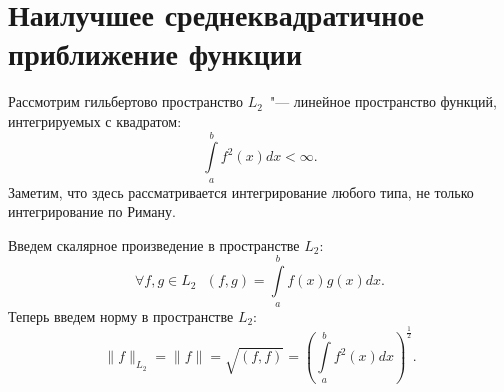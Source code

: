 \documentclass[11pt,a4paper,twoside,listtotoc,bibtotoc]{report}
\numberwithin{equation}{section}
\theoremstyle{definition}
\theoremstyle{plain}
\begin{document}
\section{Наилучшее среднеквадратичное приближение функции}
%

Рассмотрим гильбертово пространство $L_2$~"--- линейное
пространство функций, интегрируемых с квадратом:
%
$$
    \int\limits_a^b{f^2(x)dx} < \infty.
$$
%
Заметим, что здесь рассматривается интегрирование любого типа, не только
интегрирование по Риману.

Введем скалярное произведение в пространстве $L_2$:
%
$$
    \forall f,g \in L_2 ~~~(f,g)=\int\limits_a^b{f(x)g(x)dx}.
$$
%
Теперь введем норму в пространстве $L_2$:
%
$$
    \|f\|_{L_2}=\|f\|=\sqrt{(f,f)}=
    \left(\int\limits_a^b{f^2(x)dx}\right)^{\frac{1}{2}}.
$$
%
\end{document}
